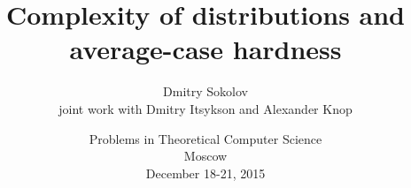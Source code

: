 

\title[Complexity of distributions and average-case hardness]{
	Complexity of distributions and average-case hardness
}
  
\author[Sokolov D.]{Dmitry Sokolov\\ joint work with Dmitry Itsykson and Alexander Knop}

\date{Problems in Theoretical Computer Science\\
	Moscow\\
	December 18-21, 2015
}



	\maketitle

	
    
    



